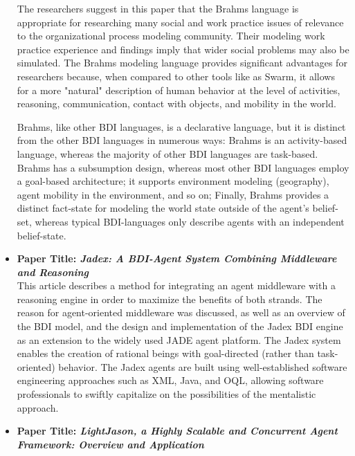 \begin{itemize}[label={}]
The researchers suggest in this paper \cite{brahms} that the Brahms language is appropriate for researching many social and work practice issues of relevance to the organizational process modeling community. Their modeling work practice experience and findings imply that wider social problems may also be simulated. The Brahms modeling language provides significant advantages for researchers because, when compared to other tools like as Swarm, it allows for a more "natural" description of human behavior at the level of activities, reasoning, communication, contact with objects, and mobility in the world.

\vspace{.5cm}

Brahms, like other \ac{BDI} languages, is a declarative language, but it is distinct from the other \ac{BDI} languages in numerous ways:
Brahms is an activity-based language, whereas the majority of other \ac{BDI} languages are task-based. Brahms has a subsumption design, whereas most other \ac{BDI} languages employ a goal-based architecture; it supports environment modeling (geography), agent mobility in the environment, and so on; Finally, Brahms provides a distinct fact-state for modeling the world state outside of the agent's belief-set, whereas typical \ac{BDI}-languages only describe agents with an independent belief-state.

\vspace{.5cm}

\item \textbf{Paper Title: \textit{Jadex: A \ac{BDI}-Agent System Combining Middleware and Reasoning}}\\

This article \cite{jadex} describes a method for integrating an agent middleware with a reasoning engine in order to maximize the benefits of both strands. The reason for agent-oriented middleware was discussed, as well as an overview of the \ac{BDI} model, and the design and implementation of the Jadex \ac{BDI} engine as an extension to the widely used JADE agent platform. The Jadex system enables the creation of rational beings with goal-directed (rather than task-oriented) behavior. The Jadex agents are built using well-established software engineering approaches such as XML, Java, and OQL, allowing software professionals to swiftly capitalize on the possibilities of the mentalistic approach.

\vspace{.5cm}

\item \textbf{Paper Title: \textit{LightJason, a Highly Scalable and Concurrent Agent Framework: Overview and Application}}\\


\end{itemize}

